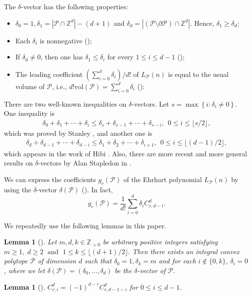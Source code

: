 \documentclass[12pt]{amsart}
\newtheorem{lemma}[theorem]{Lemma}
\theoremstyle{definition}
\theoremstyle{remark}
\numberwithin{equation}{section}
\def\Pc{{\mathcal P}}
\def\NZQ{\mathbb}               %
\def\ZZ{{\NZQ Z}}
\begin{document}
The $\delta$-vector has the following properties:
\begin{itemize}
	\item[(i)] $\delta_0=1,\delta_1=|\Pc \cap \ZZ^d|-(d+1)$ and $\delta_d=|(\Pc\setminus \partial \Pc) \cap \ZZ^d|$. Hence, $\delta_1 \geq \delta_d$; 
	\item[(ii)] Each $\delta_i$ is nonnegative (\cite{RS_DRCP});
	\item[(iii)] If $\delta_d \neq 0$, then one has $\delta_1 \leq \delta_i$ for every $1 \leq i \leq d-1$ (\cite{H_LBTEP});
	\item[(iv)] The leading coefficient $(\sum_{i=0}^{d}\delta_i)/d!$ of $L_\Pc(n)$ is equal to the usual volume of $\Pc$, i.e., $d!\text{vol}(\Pc)=\sum_{i=0}^{d}\delta_i$ (\cite[Corollary 3.20, 3.21]{Beck}):
\end{itemize}

There are two well-known inequalities on $\delta$-vectors.
Let $s = \max\left\{i : \delta_i \neq 0 \right\}$.
One inequality is
\begin{align}
\delta_0+\delta_1+\cdots+\delta_{i}\leq \delta_s+\delta_{s-1}+\cdots+\delta_{s-i}, \ \ 0 \leq i \leq \lfloor s/2 \rfloor,
\end{align}
which was proved by Stanley \cite{RS_OHF}, and another one is
\begin{align}
\delta_d+\delta_{d-1}+\cdots+\delta_{d-i}\leq \delta_1+\delta_2+\cdots+\delta_{i+1}, \ \ 0 \leq i \leq\lfloor(d-1)/2\rfloor ,
\end{align}
which appears in the work of Hibi \cite[Remark 1.4]{H_LBTEP}.
Also, there are more recent and more general results on $\delta$-vectors by Alan Stapledon in \cite{Stap}.

We can express the coefficients $g_r(\Pc)$ of the Ehrhart polynomial $L_\Pc(n)$ by using the $\delta$-vector $\delta(\Pc)$ (\cite[Proof of Theorem 1.1]{lower}).
In fact,
 $$g_r(\Pc)=\frac{1}{d!}\sum\limits_{i=0}^{d}\delta_iC_{r,d-i}^d.$$
 
We repeatedly use the following lemmas in this paper.
\begin{lemma}[{\cite[Theorem 1.1]{Higashitani}}]
	\label{higashitani}
	Let $m,d,k \in \ZZ_{> 0}$ be arbitrary positive integers satisfying
	$m \geq 1, \; d \geq 2 \; \text{ and } \; 
	1 \leq k \leq \lfloor (d+1)/2 \rfloor.$
	Then there exists an integral convex polytope $\Pc$ of dimension $d$
	such that $\delta_0=1,\delta_k=m$ and for each $i \notin \{0,k\}$, $\delta_i=0$, where we let $\delta(\Pc)=(\delta_0,\ldots,\delta_d)$ be the $\delta$-vector of $\Pc.$
\end{lemma}
\begin{lemma}[{\cite[Lemma 2.2]{lower}}]
	\label{sym}
	$C_{r,i}^d=(-1)^{d-r}C_{r,d-1-i}^d$ for $0\leq i\leq d-1$.
\end{lemma}
\end{document}
